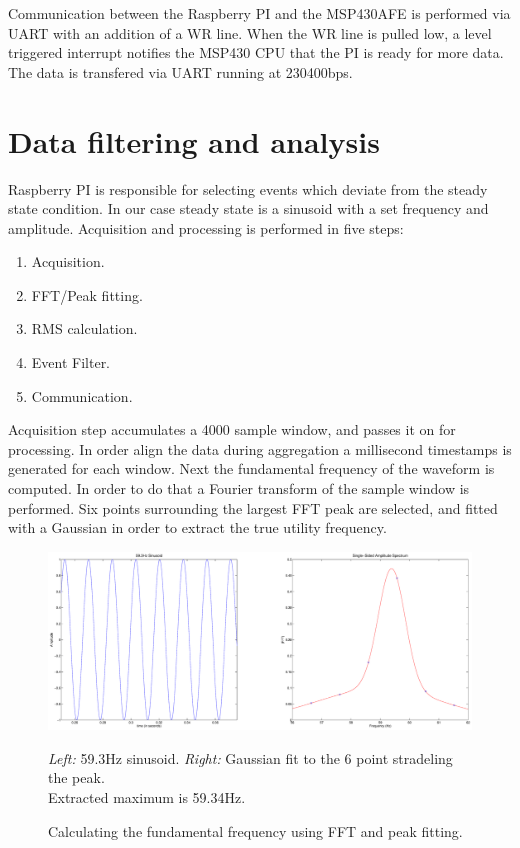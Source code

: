 Communication between the Raspberry PI and the MSP430AFE is performed via UART with an addition of a WR line. When the WR line is pulled low, a level triggered interrupt notifies the MSP430 CPU
that the PI is ready for more data. The data is transfered via UART running at 230400bps.

\section{Data filtering and analysis}
	Raspberry PI is responsible for selecting events which deviate from the steady state condition. In our case steady state is a sinusoid with a set frequency and amplitude. Acquisition and processing
is performed in five steps:
\begin{enumerate}
\item Acquisition.
\item FFT/Peak fitting.
\item RMS calculation.
\item Event Filter.
\item Communication.
\end{enumerate}

	Acquisition step accumulates a 4000 sample window, and passes it on for processing. In order align the data during aggregation a millisecond timestamps is generated for each window.
Next the fundamental frequency of the waveform is computed. In order to do that a Fourier transform of the sample window is performed. Six points surrounding the largest FFT peak are selected,
and fitted  with a Gaussian in order to extract the true utility frequency.  

\begin{figure}[h!]
\centering
\includegraphics[width=\textwidth]{img/fftFit.eps}
\caption{Calculating the fundamental frequency using FFT and peak fitting.}
\textit{Left:} 59.3Hz sinusoid. \textit{Right:} Gaussian fit to the 6 point stradeling the peak.\\
Extracted maximum is 59.34Hz.
\end{figure}


